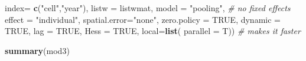 \documentclass[
  a4paper,
]{article}
\newenvironment{Shaded}{\begin{snugshade}}{\end{snugshade}}
\newcommand{\AttributeTok}[1]{\textcolor[rgb]{0.13,0.29,0.53}{#1}}
\newcommand{\CommentTok}[1]{\textcolor[rgb]{0.56,0.35,0.01}{\textit{#1}}}
\newcommand{\ConstantTok}[1]{\textcolor[rgb]{0.56,0.35,0.01}{#1}}
\newcommand{\FunctionTok}[1]{\textcolor[rgb]{0.13,0.29,0.53}{\textbf{#1}}}
\newcommand{\NormalTok}[1]{#1}
\newcommand{\StringTok}[1]{\textcolor[rgb]{0.31,0.60,0.02}{#1}}
\begin{document}
\begin{Shaded}
\begin{Highlighting}[]
                             \AttributeTok{index=} \FunctionTok{c}\NormalTok{(}\StringTok{"cell"}\NormalTok{,}\StringTok{"year"}\NormalTok{),}
                             \AttributeTok{listw =}\NormalTok{ listwmat,}
                             \AttributeTok{model =} \StringTok{"pooling"}\NormalTok{,  }\CommentTok{\# no fixed effects}
                             \AttributeTok{effect =} \StringTok{"individual"}\NormalTok{, }
                             \AttributeTok{spatial.error=}\StringTok{"none"}\NormalTok{,}
                             \AttributeTok{zero.policy =} \ConstantTok{TRUE}\NormalTok{, }
                             \AttributeTok{dynamic =} \ConstantTok{TRUE}\NormalTok{,}
                             \AttributeTok{lag =} \ConstantTok{TRUE}\NormalTok{, }
                             \AttributeTok{Hess =} \ConstantTok{TRUE}\NormalTok{,}
                             \AttributeTok{local=}\FunctionTok{list}\NormalTok{( }\AttributeTok{parallel =}\NormalTok{ T)) }\CommentTok{\# makes it faster}

\FunctionTok{summary}\NormalTok{(mod3)}
\end{Highlighting}
\end{Shaded}
\end{document}
